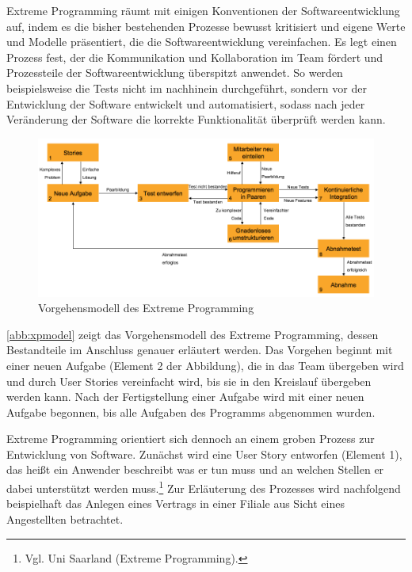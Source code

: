             Extreme Programming räumt mit einigen Konventionen der Softwareentwicklung auf, indem es die bisher bestehenden Prozesse bewusst kritisiert und eigene Werte und Modelle präsentiert, die die Softwareentwicklung vereinfachen. Es legt einen Prozess fest, der die Kommunikation und Kollaboration im Team fördert und Prozessteile der Softwareentwicklung überspitzt anwendet. So werden beispielsweise die Tests nicht im nachhinein durchgeführt, sondern vor der Entwicklung der Software entwickelt und automatisiert, sodass nach jeder Veränderung der Software die korrekte Funktionalität überprüft werden kann.

            \begin{figure}[H]%
                \includegraphics[width=15cm]{Abbildungen/XP_vorgehensmodell}
                \caption[Vorgehensmodell des Extreme Programming]{Vorgehensmodell des Extreme Programming\protect\footnotemark}
                \label{abb:xpmodel}
            \end{figure}


            \autoref{abb:xpmodel} zeigt das Vorgehensmodell des Extreme Programming, dessen Bestandteile im Anschluss genauer erläutert werden. Das Vorgehen beginnt mit einer neuen Aufgabe (Element 2 der Abbildung), die in das Team übergeben wird und durch User Stories vereinfacht wird, bis sie in den Kreislauf übergeben werden kann. Nach der Fertigstellung einer Aufgabe wird mit einer neuen Aufgabe begonnen, bis alle Aufgaben des Programms abgenommen wurden.

            Extreme Programming orientiert sich dennoch an einem groben Prozess zur Entwicklung von Software. Zunächst wird eine User Story entworfen (Element 1), das heißt ein Anwender beschreibt was er tun muss und an welchen Stellen er dabei unterstützt werden muss.\footnote{Vgl. Uni Saarland (Extreme Programming).} Zur Erläuterung des Prozesses wird nachfolgend beispielhaft das Anlegen eines Vertrags in einer Filiale aus Sicht eines Angestellten betrachtet.

